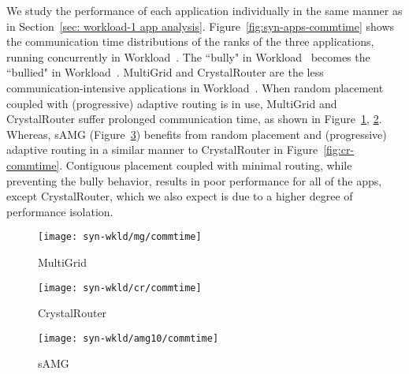 We study the performance of each application individually in the same manner as
in Section~\ref{sec: workload-1 app analysis}.
Figure~\ref{fig:syn-apps-commtime} shows the communication time distributions of
the ranks of the three applications, running concurrently in Workload~.
The ``bully" in Workload~ becomes the ``bullied" in Workload~. 
MultiGrid and CrystalRouter are the less communication-intensive applications in Workload~. 
When random placement coupled with (progressive) adaptive routing is in use, 
MultiGrid and CrystalRouter suffer prolonged communication time, 
as shown in Figure~\ref{fig:syn-mg-commtime}, \ref{fig:syn-cr-commtime}. 
Whereas, sAMG (Figure~\ref{fig:syn-samg-commtime}) benefits from random placement and (progressive) adaptive routing
in a similar manner to CrystalRouter in Figure~\ref{fig:cr-commtime}.
Contiguous placement coupled with minimal routing, while preventing the bully
behavior, results in poor performance for all of the apps, except CrystalRouter,
which we also expect is due to a higher degree of performance isolation.

\begin{figure*}[t!]
    \centering
    \begin{subfigure}[t]{0.32\textwidth}
        \centering
        \texttt{[image: syn-wkld/mg/commtime]}
        \caption{MultiGrid}
        \label{fig:syn-mg-commtime}
    \end{subfigure}%
    \begin{subfigure}[t]{0.32\textwidth}
        \centering
        \texttt{[image: syn-wkld/cr/commtime]}
        \caption{CrystalRouter}
        \label{fig:syn-cr-commtime}
    \end{subfigure}%
    \hspace{1em}%
    \begin{subfigure}[t]{0.32\textwidth}
        \centering
        \texttt{[image: syn-wkld/amg10/commtime]}
        \caption{sAMG}
        \label{fig:syn-samg-commtime}
    \end{subfigure}%

   \caption{The communication time of all ranks in each application. Three applications running concurrently on dragonfly network with different placement and routing configurations. The ``bully", sAMG, benefits from random placement and adaptive routing, while the ``bullied", MultiGrid and CrystalRouter, suffer performance degradation.}
   \label{fig:syn-apps-commtime}
\end{figure*}



